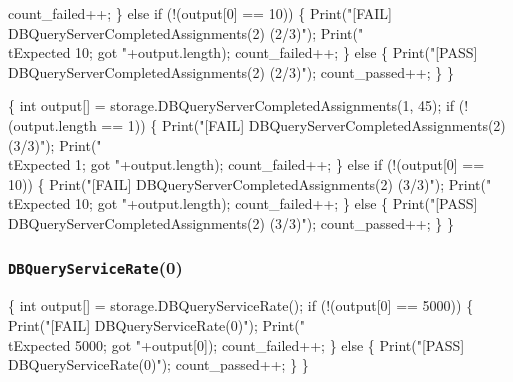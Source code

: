 \documentclass{article}
\def\nwendcode{\endtrivlist \endgroup}
\let\nwdocspar=\par
\begin{document}
    count_failed++;
  \} else if (!(output[0] == 10)) \{
    Print("[FAIL] DBQueryServerCompletedAssignments(2) (2/3)");
    Print("\\tExpected 10; got "+output.length);
    count_failed++;
  \} else \{
    Print("[PASS] DBQueryServerCompletedAssignments(2) (2/3)");
    count_passed++;
  \}
\}
\nwendcode{}\nwdocspar
\nwenddocs{}\endmoddef{}
\{
  int output[] = storage.DBQueryServerCompletedAssignments(1, 45);
  if (!(output.length == 1)) \{
    Print("[FAIL] DBQueryServerCompletedAssignments(2) (3/3)");
    Print("\\tExpected 1; got "+output.length);
    count_failed++;
  \} else if (!(output[0] == 10)) \{
    Print("[FAIL] DBQueryServerCompletedAssignments(2) (3/3)");
    Print("\\tExpected 10; got "+output.length);
    count_failed++;
  \} else \{
    Print("[PASS] DBQueryServerCompletedAssignments(2) (3/3)");
    count_passed++;
  \}
\}
\nwendcode{}\nwdocspar
\subsubsection{{\tt{}DBQueryServiceRate}(0)}
\nwenddocs{}\endmoddef{}
\{
  int output[] = storage.DBQueryServiceRate();
  if (!(output[0] == 5000)) \{
    Print("[FAIL] DBQueryServiceRate(0)");
    Print("\\tExpected 5000; got "+output[0]);
    count_failed++;
  \} else \{
    Print("[PASS] DBQueryServiceRate(0)");
    count_passed++;
  \}
\}
\nwendcode{}\nwdocspar
\end{document}
